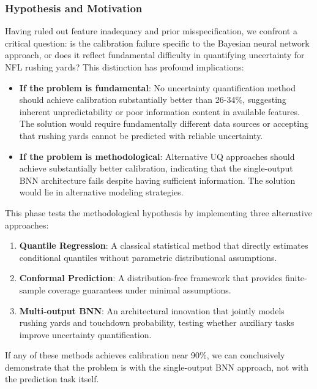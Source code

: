 \subsubsection{Hypothesis and Motivation}

Having ruled out feature inadequacy and prior misspecification, we confront a critical question: is the calibration failure specific to the Bayesian neural network approach, or does it reflect fundamental difficulty in quantifying uncertainty for NFL rushing yards? This distinction has profound implications:

\begin{itemize}
    \item \textbf{If the problem is fundamental}: No uncertainty quantification method should achieve calibration substantially better than 26-34\%, suggesting inherent unpredictability or poor information content in available features. The solution would require fundamentally different data sources or accepting that rushing yards cannot be predicted with reliable uncertainty.

    \item \textbf{If the problem is methodological}: Alternative UQ approaches should achieve substantially better calibration, indicating that the single-output BNN architecture fails despite having sufficient information. The solution would lie in alternative modeling strategies.
\end{itemize}

This phase tests the methodological hypothesis by implementing three alternative approaches:

\begin{enumerate}
    \item \textbf{Quantile Regression}: A classical statistical method that directly estimates conditional quantiles without parametric distributional assumptions.
    \item \textbf{Conformal Prediction}: A distribution-free framework that provides finite-sample coverage guarantees under minimal assumptions.
    \item \textbf{Multi-output BNN}: An architectural innovation that jointly models rushing yards and touchdown probability, testing whether auxiliary tasks improve uncertainty quantification.
\end{enumerate}

If any of these methods achieves calibration near 90\%, we can conclusively demonstrate that the problem is with the single-output BNN approach, not with the prediction task itself.

